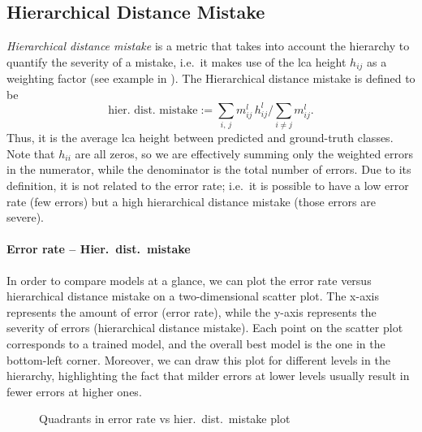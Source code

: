 \subsection{Hierarchical Distance Mistake}
\label{subsec:hierarchical-distance-mistake}
\emph{Hierarchical distance mistake} is a metric that takes into account the hierarchy to quantify the severity of a mistake, i.e.\ it makes use of the \acrshort{lca} height $h_{ij}$ as a weighting factor (see example in ).
The Hierarchical distance mistake is defined to be
\begin{equation}
  \textrm{hier.\ dist.\ mistake} :=
  \sum_{i, \, j} m_{ij}^l \, h_{ij}^l \bigg/ \sum_{i \ne j} m_{ij}^l.
  \label{eq:hierarchical-distance-mistake}
\end{equation}
Thus, it is the average \acrshort{lca} height between predicted and ground-truth classes.
Note that $h_{ii}$ are all zeros, so we are effectively summing only the weighted errors in the numerator, while the denominator is the total number of errors. Due to its definition, it is not related to the error rate; i.e.\ it is possible to have a low error rate (few errors) but a high hierarchical distance mistake (those errors are severe).

\paragraph{Error rate -- Hier.\ dist.\ mistake}
\label{par:error-rate-hier-dist-mistake}
In order to compare models at a glance, we can plot the error rate versus hierarchical distance mistake on a two-dimensional scatter plot.
The x-axis represents the amount of error (error rate), while the y-axis represents the severity of errors (hierarchical distance mistake). Each point on the scatter plot corresponds to a trained model, and the overall best model is the one in the bottom-left corner.
Moreover, we can draw this plot for different levels in the hierarchy, highlighting the fact that milder errors at lower levels usually result in fewer errors at higher ones.
\begin{figure}[htbp]
  \caption{Quadrants in error rate vs hier.\ dist.\ mistake plot}
  \label{fig:04/error-rate-hier-dist-mistake}
\end{figure}

